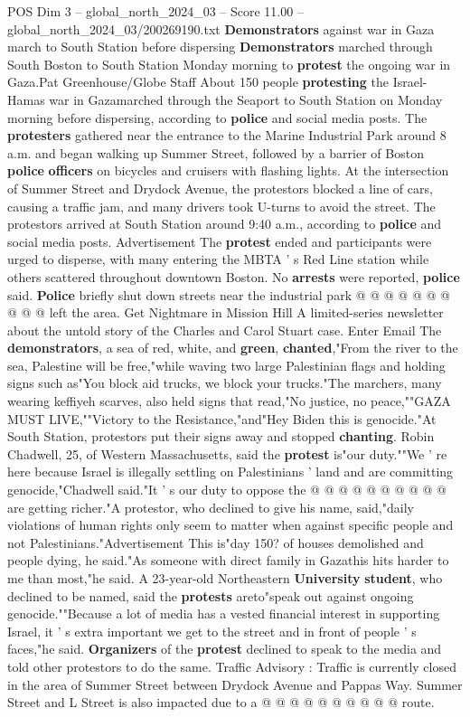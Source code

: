 \begin{textsample}{POS Dim 3 – global\_north\_2024\_03 – Score 11.00 – global\_north\_2024\_03/200269190.txt}  \label{ex:f3_pos_275}
\textbf{Demonstrators} against war in Gaza march to South Station before dispersing \textbf{Demonstrators} marched through South Boston to South Station Monday morning to \textbf{protest} the ongoing war in Gaza.Pat Greenhouse/Globe Staff About 150 people \textbf{protesting} the Israel-Hamas war in Gazamarched through the Seaport to South Station on Monday morning before dispersing, according to \textbf{police} and social media posts.
The \textbf{protesters} gathered near the entrance to the Marine Industrial Park around 8 a.m. and began walking up Summer Street, followed by a barrier of Boston \textbf{police} \textbf{officers} on bicycles and cruisers with flashing lights.
At the intersection of Summer Street and Drydock Avenue, the protestors blocked a line of cars, causing a traffic jam, and many drivers took U-turns to avoid the street.
The protestors arrived at South Station around 9:40 a.m., according to \textbf{police} and social media posts.
Advertisement The \textbf{protest} ended and participants were urged to disperse, with many entering the MBTA ' s Red Line station while others scattered throughout downtown Boston.
No \textbf{arrests} were reported, \textbf{police} said. \textbf{Police} briefly shut down streets near the industrial park @ @ @ @ @ @ @ @ @ @ left the area.
Get Nightmare in Mission Hill A limited-series newsletter about the untold story of the Charles and Carol Stuart case.
Enter Email The \textbf{demonstrators}, a sea of red, white, and \textbf{green}, \textbf{chanted},"From the river to the sea, Palestine will be free,"while waving two large Palestinian flags and holding signs such as"You block aid trucks, we block your trucks."The marchers, many wearing keffiyeh scarves, also held signs that read,"No justice, no peace,""GAZA MUST LIVE,""Victory to the Resistance,"and"Hey Biden this is genocide."At South Station, protestors put their signs away and stopped \textbf{chanting}.
Robin Chadwell, 25, of Western Massachusetts, said the \textbf{protest} is"our duty.""We ' re here because Israel is illegally settling on Palestinians ' land and are committing genocide,"Chadwell said."It ' s our duty to oppose the @ @ @ @ @ @ @ @ @ @ are getting richer."A protestor, who declined to give his name, said,"daily violations of human rights only seem to matter when against specific people and not Palestinians."Advertisement This is"day 150? of houses demolished and people dying, he said."As someone with direct family in Gazathis hits harder to me than most,"he said.
A 23-year-old Northeastern \textbf{University} \textbf{student}, who declined to be named, said the \textbf{protests} areto"speak out against ongoing genocide.""Because a lot of media has a vested financial interest in supporting Israel, it ' s extra important we get to the street and in front of people ' s faces,"he said. \textbf{Organizers} of the \textbf{protest} declined to speak to the media and told other protestors to do the same.
Traffic Advisory : Traffic is currently closed in the area of Summer Street between Drydock Avenue and Pappas Way.
Summer Street and L Street is also impacted due to a @ @ @ @ @ @ @ @ @ @ route.


\end{textsample}
